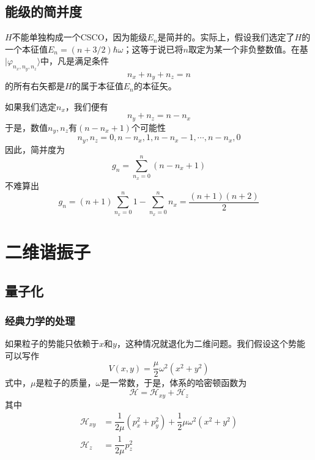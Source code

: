 \documentclass[]{article}
\begin{document}
\subsection{能级的简并度}
$H$不能单独构成一个CSCO，因为能级$E_n$是简并的。实际上，假设我们选定了$H$的一个本征值$E_n=(n+3/2)\hbar\omega$；这等于说已将$n$取定为某一个非负整数值。在基${|\varphi_{n_x,n_y,n_z}\rangle}$中，凡是满足条件
\begin{equation}
	n_x+n_y+n_z=n
\end{equation}
的所有右矢都是$H$的属于本征值$E_n$的本征矢。\par 
如果我们选定$n_x$，我们便有
\begin{equation}
	n_y+n_z=n-n_x
\end{equation}
于是，数值${n_y,n_z}$有$(n-n_x+1)$个可能性
\begin{equation}
	{n_y,n_z}={0,n-n_x},{1,n-n_x-1},\cdots,{n-n_x,0}
\end{equation}
因此，简并度为
\begin{equation}
	g_n=\sum\limits_{n_x=0}^{n}(n-n_x+1)
\end{equation}
不难算出
\begin{equation}
	g_n=(n+1)\sum\limits_{n_x=0}^{n}1-\sum\limits_{n_x=0}^{n}n_x=\dfrac{(n+1)(n+2)}{2}
\end{equation}
\section{二维谐振子}
\subsection{量子化}
\subsubsection{经典力学的处理}
如果粒子的势能只依赖于$x$和$y$，这种情况就退化为二维问题。我们假设这个势能可以写作
\begin{equation}
	V(x,y)=\dfrac{\mu}{2}\omega^2(x^2+y^2)
\end{equation}
式中，$\mu$是粒子的质量，$\omega$是一常数，于是，体系的哈密顿函数为
\begin{equation}
	\mathscr{H}=\mathscr{H}_{xy}+\mathscr{H}_z
\end{equation}
其中
\begin{align}
	\mathscr{H}_{xy}&=\dfrac{1}{2\mu}(p_x^2+p_y^2)+\dfrac{1}{2}\mu\omega^2(x^2+y^2)\nonumber\\
	\mathscr{H}_z&=\dfrac{1}{2\mu}p_z^2
\end{align}
\end{document}
